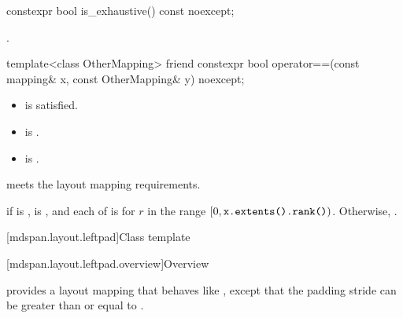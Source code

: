 %
\begin{itemdecl}
constexpr bool is_exhaustive() const noexcept;
\end{itemdecl}

\begin{itemdescr}
\pnum
\returns
{}.
\end{itemdescr}

%
\begin{itemdecl}
template<class OtherMapping>
  friend constexpr bool operator==(const mapping& x, const OtherMapping& y) noexcept;
\end{itemdecl}

\begin{itemdescr}
\pnum
\constraints
\begin{itemize}
\item
{} is satisfied.
\item
{} is .
\item
{} is .
\end{itemize}

\pnum
\expects
{} meets the layout mapping requirements.

\pnum
\returns
{} if  is ,
 is , and
each of  is 
for $r$ in the range  $[0, \tcode{x.extents().rank()})$.
Otherwise, .
\end{itemdescr}

[mdspan.layout.leftpad]{Class template }

[mdspan.layout.leftpad.overview]{Overview}

\pnum
{} provides a layout mapping
that behaves like ,
except that the padding stride 
can be greater than or equal to .

